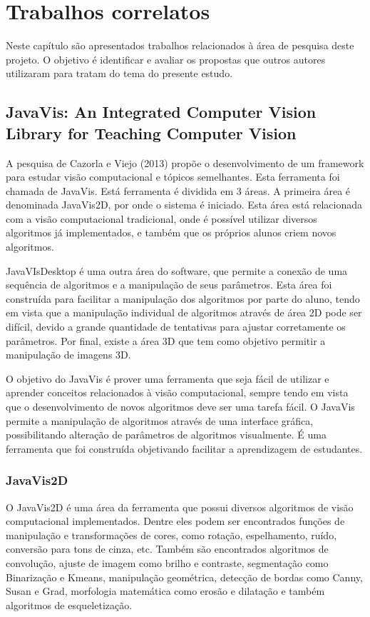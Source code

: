 \documentclass[
	12pt,				%
	oneside,			%
	a4paper,			%
	english,			%
	french,				%
	spanish,			%
	brazil,				%
	]{abntex2}
\begin{document}
\chapter{Trabalhos correlatos}

Neste capítulo são apresentados trabalhos relacionados à área de pesquisa deste projeto. O objetivo é identificar e avaliar os propostas que outros autores utilizaram para tratam do tema do presente estudo.

\section{JavaVis: An Integrated Computer Vision Library for Teaching Computer Vision}

A pesquisa de Cazorla e Viejo (2013) propõe o desenvolvimento de um framework para estudar visão computacional e tópicos semelhantes. Esta ferramenta foi chamada de JavaVis. Está ferramenta é dividida em 3 áreas. A primeira área é denominada JavaVis2D, por onde o sistema é iniciado. Esta área está relacionada com a visão computacional tradicional, onde é possível utilizar diversos algoritmos já implementados, e também que os próprios alunos criem novos algoritmos. 

JavaVIsDesktop é uma outra área do software, que permite a conexão de uma sequência de algoritmos e a manipulação de seus parâmetros. Esta área foi construída para facilitar a manipulação dos algoritmos por parte do aluno, tendo em vista que a manipulação individual de algoritmos através de área 2D pode ser difícil, devido a grande quantidade de tentativas para ajustar corretamente os parâmetros. Por final, existe a área 3D que tem como objetivo permitir a manipulação de imagens 3D.

O objetivo do JavaVis é prover uma ferramenta que seja fácil de utilizar e aprender conceitos relacionados à visão computacional, sempre tendo em vista que o desenvolvimento de novos algoritmos deve ser uma tarefa fácil. O JavaVis permite a manipulação de algoritmos através de uma interface gráfica, possibilitando alteração de parâmetros de algoritmos visualmente. É uma ferramenta que foi construída objetivando facilitar a aprendizagem de estudantes.

\subsection{JavaVis2D}

O JavaVis2D é uma área da ferramenta que possui diversos algoritmos de visão computacional implementados. Dentre eles podem ser encontrados funções de manipulação e transformações de cores, como rotação, espelhamento, ruído, conversão para tons de cinza, etc. Também são encontrados algoritmos de convolução, ajuste de imagem como brilho e contraste, segmentação como Binarização e Kmeans, manipulação geométrica, detecção de bordas como Canny, Susan e Grad, morfologia matemática como erosão e dilatação e também algoritmos de esqueletização. 
\end{document}
